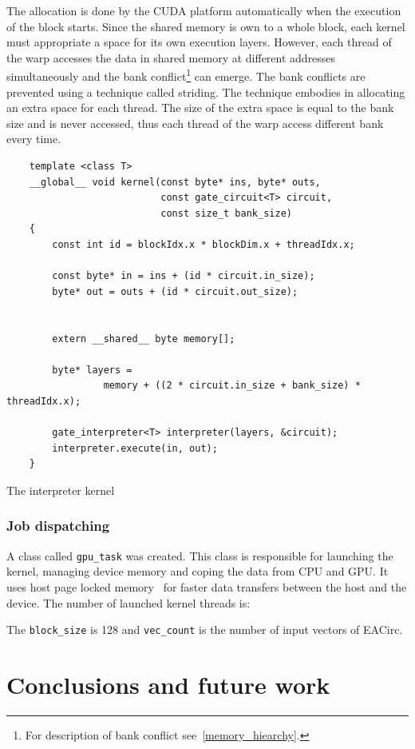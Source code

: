 \documentclass[12pt,oneside]{fithesis2}
\begin{document}
The allocation is done by the CUDA platform automatically when the execution of the block starts. Since the shared memory is own to a whole block, each kernel must appropriate a space for its own execution layers. However, each thread of the warp accesses the data in shared memory at different addresses simultaneously and the bank conflict\footnote{For description of bank conflict see~\ref{memory_hiearchy}.} can emerge. The bank conflicts are prevented using a technique called striding. The technique embodies in allocating an extra space for each thread. The size of the extra space is equal to the bank size and is never accessed, thus each thread of the warp access different bank every time.

\begin{listing}[h]
	\begin{verbatim}	
	template <class T>
	__global__ void kernel(const byte* ins, byte* outs,
	                       const gate_circuit<T> circuit,
	                       const size_t bank_size)
	{
		const int id = blockIdx.x * blockDim.x + threadIdx.x;
		
		const byte* in = ins + (id * circuit.in_size);
		byte* out = outs + (id * circuit.out_size);
		
		
		extern __shared__ byte memory[];
		
		byte* layers =
		         memory + ((2 * circuit.in_size + bank_size) * threadIdx.x);
		
		gate_interpreter<T> interpreter(layers, &circuit);
		interpreter.execute(in, out);
	}
	\end{verbatim}
	\caption{The interpreter kernel}
	\label{listing:kernel}
\end{listing}

\subsection{Job dispatching}

A class called \texttt{gpu\_task} was created. This class is responsible for launching the kernel, managing device memory and coping the data from CPU and GPU. It uses host page locked memory~\cite{cuda_guide} for faster data transfers between the host and the device. The number of launched kernel threads is:


\noindent
The \texttt{block\_size} is 128 and \texttt{vec\_count} is the number of input vectors of EACirc.

\chapter{Conclusions and future work}



\printbibliography[heading=bibintoc]
\end{document}
